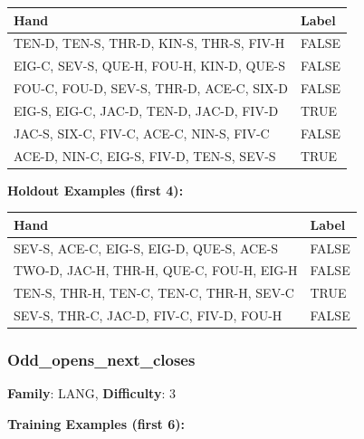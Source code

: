 \documentclass[10pt,a4paper]{article}
\begin{document}
\begin{small}
\begin{tabular}{p{8cm}l}
\toprule
Hand & Label \\
\midrule
TEN-D, TEN-S, THR-D, KIN-S, THR-S, FIV-H & \textcolor{negative}{FALSE} \\
EIG-C, SEV-S, QUE-H, FOU-H, KIN-D, QUE-S & \textcolor{negative}{FALSE} \\
FOU-C, FOU-D, SEV-S, THR-D, ACE-C, SIX-D & \textcolor{negative}{FALSE} \\
EIG-S, EIG-C, JAC-D, TEN-D, JAC-D, FIV-D & \textcolor{positive}{TRUE} \\
JAC-S, SIX-C, FIV-C, ACE-C, NIN-S, FIV-C & \textcolor{negative}{FALSE} \\
ACE-D, NIN-C, EIG-S, FIV-D, TEN-S, SEV-S & \textcolor{positive}{TRUE} \\
\bottomrule
\end{tabular}
\end{small}

\textbf{Holdout Examples (first 4):}

\begin{small}
\begin{tabular}{p{8cm}l}
\toprule
Hand & Label \\
\midrule
SEV-S, ACE-C, EIG-S, EIG-D, QUE-S, ACE-S & \textcolor{negative}{FALSE} \\
TWO-D, JAC-H, THR-H, QUE-C, FOU-H, EIG-H & \textcolor{negative}{FALSE} \\
TEN-S, THR-H, TEN-C, TEN-C, THR-H, SEV-C & \textcolor{positive}{TRUE} \\
SEV-S, THR-C, JAC-D, FIV-C, FIV-D, FOU-H & \textcolor{negative}{FALSE} \\
\bottomrule
\end{tabular}
\end{small}

\vspace{0.5cm}

\subsubsection{Odd\_opens\_next\_closes}

\textbf{Family}: LANG, \textbf{Difficulty}: 3

\textbf{Training Examples (first 6):}
\end{document}

